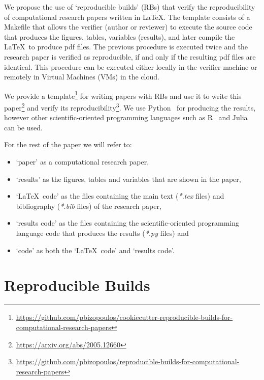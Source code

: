 \documentclass[journal]{IEEEtran}
\begin{document}
We propose the use of `reproducible builds' (RBs) that verify the reproducibility of computational research papers written in \LaTeX.
The template consists of a Makefile that allows the verifier (author or reviewer) to execute the source code that produces the figures, tables, variables (results), and later compile the \LaTeX\ to produce pdf files.
The previous procedure is executed twice and the research paper is verified as reproducible, if and only if the resulting pdf files are identical.
This procedure can be executed either locally in the verifier machine or remotely in Virtual Machines (VMs) in the cloud.

We provide a template\footnote{\url{https://github.com/pbizopoulos/cookiecutter-reproducible-builds-for-computational-research-papers}} for writing papers with RBs and use it to write this paper\footnote{\url{https://arxiv.org/abs/2005.12660}} and verify its reproducibility\footnote{\url{https://github.com/pbizopoulos/reproducible-builds-for-computational-research-papers}}.
We use Python~\cite{van2007python} for producing the results, however other scientific-oriented programming languages such as R~\cite{ihaka1996r} and Julia~\cite{bezanson2017julia} can be used.

For the rest of the paper we will refer to:
\begin{itemize}
	\item `paper' as a computational research paper,
	\item `results' as the figures, tables and variables that are shown in the paper,
	\item `\LaTeX\ code' as the files containing the main text (\textit{*.tex} files) and bibliography (\textit{*.bib} files) of the research paper,
	\item `results code' as the files containing the scientific-oriented programming language code that produces the results (\textit{*.py} files) and
	\item `code' as both the `\LaTeX\ code' and `results code'.
\end{itemize}

\section{Reproducible Builds}
\end{document}
